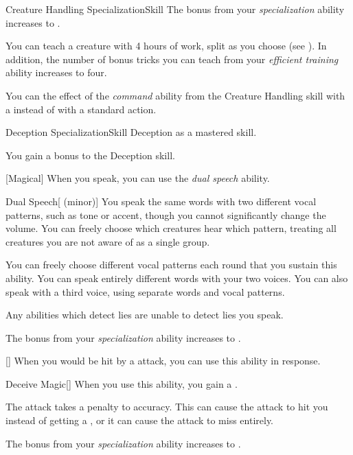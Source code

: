 \begin{feat}{Creature Handling Specialization}{Skill}
         The bonus from your \textit{specialization} ability increases to .

         You can teach a creature with 4 hours of work, split as you choose (see ).
        In addition, the number of bonus tricks you can teach from your \textit{efficient training} ability increases to four.

         You can  the effect of the \textit{command} ability from the Creature Handling skill with a  instead of with a standard action.
    \end{feat}

    \begin{feat}{Deception Specialization}{Skill}
        \featpre Deception as a mastered skill.

         You gain a  bonus to the Deception skill.

        [Magical] When you speak, you can use the \textit{dual speech} ability.
        \begin{freeability}{Dual Speech}[ (minor)]
            You speak the same words with two different vocal patterns, such as tone or accent, though you cannot significantly change the volume.
            You can freely choose which creatures hear which pattern, treating all creatures you are not aware of as a single group. 

            You can freely choose different vocal patterns each round that you sustain this ability.
            \rankline
             You can speak entirely different words with your two voices.
             You can also speak with a third voice, using separate words and vocal patterns.
        \end{freeability}

         Any  abilities which detect lies are unable to detect lies you speak.

         The bonus from your \textit{specialization} ability increases to .

        [] When you would be hit by a  attack, you can use this ability in response.
        \begin{freeability}{Deceive Magic}[]
            When you use this ability, you gain a .

            The attack takes a  penalty to accuracy.
            This can cause the attack to hit you instead of getting a , or it can cause the attack to miss entirely.
        \end{freeability}

         The bonus from your \textit{specialization} ability increases to .
    \end{feat}

